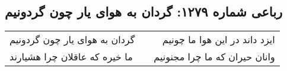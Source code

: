 \begin{center}
\section*{رباعی شماره ۱۲۷۹: گردان به هوای یار چون گردونیم}
\label{sec:1279}
\begin{longtable}{l p{0.5cm} r}
گردان به هوای یار چون گردونیم
&&
ایزد داند در این هوا ما چونیم
\\
ما خیره که عاقلان چرا هشیارند
&&
وانان حیران که ما چرا مجنونیم
\\
\end{longtable}
\end{center}
